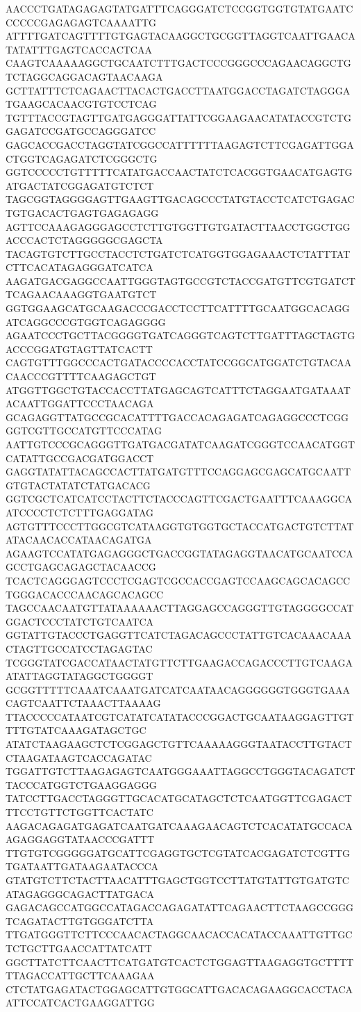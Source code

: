 AACCCTGATAGAGAGTATGATTTCAGGGATCTCCGGTGGTGTATGAATCCCCCCGAGAGAGTCAAAATTG
ATTTTGATCAGTTTTGTGAGTACAAGGCTGCGGTTAGGTCAATTGAACATATATTTGAGTCACCACTCAA
CAAGTCAAAAAGGCTGCAATCTTTGACTCCCGGGCCCAGAACAGGCTGTCTAGGCAGGACAGTAACAAGA
GCTTATTTCTCAGAACTTACACTGACCTTAATGGACCTAGATCTAGGGATGAAGCACAACGTGTCCTCAG
TGTTTACCGTAGTTGATGAGGGATTATTCGGAAGAACATATACCGTCTGGAGATCCGATGCCAGGGATCC
GAGCACCGACCTAGGTATCGGCCATTTTTTAAGAGTCTTCGAGATTGGACTGGTCAGAGATCTCGGGCTG
GGTCCCCCTGTTTTTCATATGACCAACTATCTCACGGTGAACATGAGTGATGACTATCGGAGATGTCTCT
TAGCGGTAGGGGAGTTGAAGTTGACAGCCCTATGTACCTCATCTGAGACTGTGACACTGAGTGAGAGAGG
AGTTCCAAAGAGGGAGCCTCTTGTGGTTGTGATACTTAACCTGGCTGGACCCACTCTAGGGGGCGAGCTA
TACAGTGTCTTGCCTACCTCTGATCTCATGGTGGAGAAACTCTATTTATCTTCACATAGAGGGATCATCA
AAGATGACGAGGCCAATTGGGTAGTGCCGTCTACCGATGTTCGTGATCTTCAGAACAAAGGTGAATGTCT
GGTGGAAGCATGCAAGACCCGACCTCCTTCATTTTGCAATGGCACAGGATCAGGCCCGTGGTCAGAGGGG
AGAATCCCTGCTTACGGGGTGATCAGGGTCAGTCTTGATTTAGCTAGTGACCCGGATGTAGTTATCACTT
CAGTGTTTGGCCCACTGATACCCCACCTATCCGGCATGGATCTGTACAACAACCCGTTTTCAAGAGCTGT
ATGGTTGGCTGTACCACCTTATGAGCAGTCATTTCTAGGAATGATAAATACAATTGGATTCCCTAACAGA
GCAGAGGTTATGCCGCACATTTTGACCACAGAGATCAGAGGCCCTCGGGGTCGTTGCCATGTTCCCATAG
AATTGTCCCGCAGGGTTGATGACGATATCAAGATCGGGTCCAACATGGTCATATTGCCGACGATGGACCT
GAGGTATATTACAGCCACTTATGATGTTTCCAGGAGCGAGCATGCAATTGTGTACTATATCTATGACACG
GGTCGCTCATCATCCTACTTCTACCCAGTTCGACTGAATTTCAAAGGCAATCCCCTCTCTTTGAGGATAG
AGTGTTTCCCTTGGCGTCATAAGGTGTGGTGCTACCATGACTGTCTTATATACAACACCATAACAGATGA
AGAAGTCCATATGAGAGGGCTGACCGGTATAGAGGTAACATGCAATCCAGCCTGAGCAGAGCTACAACCG
TCACTCAGGGAGTCCCTCGAGTCGCCACCGAGTCCAAGCAGCACAGCCTGGGACACCCAACAGCACAGCC
TAGCCAACAATGTTATAAAAAACTTAGGAGCCAGGGTTGTAGGGGCCATGGACTCCCTATCTGTCAATCA
GGTATTGTACCCTGAGGTTCATCTAGACAGCCCTATTGTCACAAACAAACTAGTTGCCATCCTAGAGTAC
TCGGGTATCGACCATAACTATGTTCTTGAAGACCAGACCCTTGTCAAGAATATTAGGTATAGGCTGGGGT
GCGGTTTTTCAAATCAAATGATCATCAATAACAGGGGGGTGGGTGAAACAGTCAATTCTAAACTTAAAAG
TTACCCCCATAATCGTCATATCATATACCCGGACTGCAATAAGGAGTTGTTTTGTATCAAAGATAGCTGC
ATATCTAAGAAGCTCTCGGAGCTGTTCAAAAAGGGTAATACCTTGTACTCTAAGATAAGTCACCAGATAC
TGGATTGTCTTAAGAGAGTCAATGGGAAATTAGGCCTGGGTACAGATCTTACCCATGGTCTGAAGGAGGG
TATCCTTGACCTAGGGTTGCACATGCATAGCTCTCAATGGTTCGAGACTTTCCTGTTCTGGTTCACTATC
AAGACAGAGATGAGATCAATGATCAAAGAACAGTCTCACATATGCCACAAGAGGAGGTATAACCCGATTT
TTGTGTCGGGGGATGCATTCGAGGTGCTCGTATCACGAGATCTCGTTGTGATAATTGATAAGAATACCCA
GTATGTCTTCTACTTAACATTTGAGCTGGTCCTTATGTATTGTGATGTCATAGAGGGCAGACTTATGACA
GAGACAGCCATGGCCATAGACCAGAGATATTCAGAACTTCTAAGCCGGGTCAGATACTTGTGGGATCTTA
TTGATGGGTTCTTCCCAACACTAGGCAACACCACATACCAAATTGTTGCTCTGCTTGAACCATTATCATT
GGCTTATCTTCAACTTCATGATGTCACTCTGGAGTTAAGAGGTGCTTTTTTAGACCATTGCTTCAAAGAA
CTCTATGAGATACTGGAGCATTGTGGCATTGACACAGAAGGCACCTACAATTCCATCACTGAAGGATTGG
